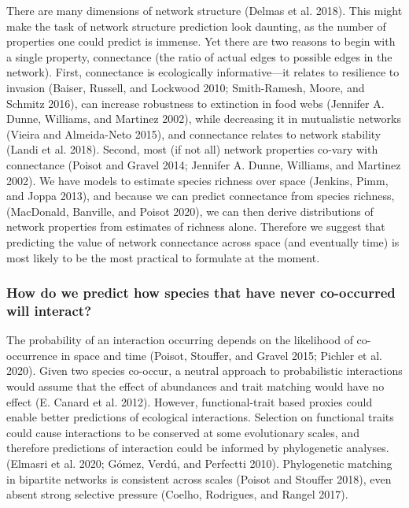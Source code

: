 \documentclass[11pt]{article}
\begin{document}
There are many dimensions of network structure (Delmas et al. 2018).
This might make the task of network structure prediction look daunting,
as the number of properties one could predict is immense. Yet there are
two reasons to begin with a single property, connectance (the ratio of
actual edges to possible edges in the network). First, connectance is
ecologically informative---it relates to resilience to invasion (Baiser,
Russell, and Lockwood 2010; Smith-Ramesh, Moore, and Schmitz 2016), can
increase robustness to extinction in food webs (Jennifer A. Dunne,
Williams, and Martinez 2002), while decreasing it in mutualistic
networks (Vieira and Almeida-Neto 2015), and connectance relates to
network stability (Landi et al. 2018). Second, most (if not all) network
properties co-vary with connectance (Poisot and Gravel 2014; Jennifer A.
Dunne, Williams, and Martinez 2002). We have models to estimate species
richness over space (Jenkins, Pimm, and Joppa 2013), and because we can
predict connectance from species richness, (MacDonald, Banville, and
Poisot 2020), we can then derive distributions of network properties
from estimates of richness alone. Therefore we suggest that predicting
the value of network connectance across space (and eventually time) is
most likely to be the most practical to formulate at the moment.

\hypertarget{how-do-we-predict-how-species-that-have-never-co-occurred-will-interact}{%
\subsubsection{How do we predict how species that have never co-occurred
will
interact?}\label{how-do-we-predict-how-species-that-have-never-co-occurred-will-interact}}

The probability of an interaction occurring depends on the likelihood of
co-occurrence in space and time (Poisot, Stouffer, and Gravel 2015;
Pichler et al. 2020). Given two species co-occur, a neutral approach to
probabilistic interactions would assume that the effect of abundances
and trait matching would have no effect (E. Canard et al. 2012).
However, functional-trait based proxies could enable better predictions
of ecological interactions. Selection on functional traits could cause
interactions to be conserved at some evolutionary scales, and therefore
predictions of interaction could be informed by phylogenetic analyses.
(Elmasri et al. 2020; Gómez, Verdú, and Perfectti 2010). Phylogenetic
matching in bipartite networks is consistent across scales (Poisot and
Stouffer 2018), even absent strong selective pressure (Coelho,
Rodrigues, and Rangel 2017).
\end{document}
